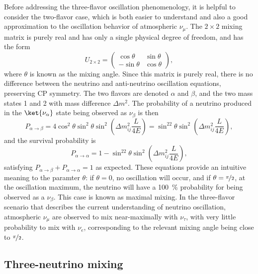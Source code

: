 Before addressing the three-flavor oscillation phenomenology,
it is helpful to consider the two-flavor case,
which is both easier to understand
and also a good approximation to the oscillation behavior
of atmospheric $\nu_\mu$.
The $2\times2$ mixing matrix is purely real
and has only a single physical degree of freedom,
and has the form
\begin{equation}\label{eq:2d_mixing}
    U_{2\times2} =
    \begin{pmatrix}
        \cos\theta & \sin\theta \\
        -\sin\theta & \cos\theta
    \end{pmatrix},
\end{equation}
where $\theta$ is known as the mixing angle.
Since this matrix is purely real,
there is no difference between the neutrino and anti-neutrino
oscillation equations, preserving CP symmetry.
The two flavors are denoted $\alpha$ and $\beta$,
and the two mass states 1 and 2 with mass difference $\Delta m^2$.
The probability of a neutrino produced in the $\ket{\nu_\alpha}$ state
being observed as $\nu_\beta$ is then
\begin{equation}\label{eq:2d_osc}
    P_{\alpha\to\beta} = 4\cos^2\theta\sin^2\theta
    \sin^2\left(\Delta m^2_{ij}\frac{L}{4E}\right)
    = \sin^22\theta \sin^2\left(\Delta m^2_{ij}\frac{L}{4E}\right),
\end{equation}
and the survival probability is
\begin{equation}\label{eq:2d_p_sur}
    P_{\alpha\to\alpha} = 1 -
    \sin^22\theta \sin^2\left(\Delta m^2_{ij}\frac{L}{4E}\right),
\end{equation}
satisfying $P_{\alpha\to\beta} + P_{\alpha\to\alpha} = 1$ as expected.
These equations provide an intuitive meaning to the paramter $\theta$:
if $\theta = 0$, no oscillation will occur,
and if $\theta = \nicefrac{\pi}{2}$,
at the oscillation maximum, the neutrino will have a \SI{100}{\percent}
probability for being observed as a $\nu_\beta$.
This case is known as maximal mixing.
In the three-flavor scenario that describes the current understanding
of neutrino oscillation,
atmospheric $\nu_\mu$ are observed to mix near-maximally with $\nu_\tau$,
with very little probability to mix with $\nu_e$,
corresponding to the relevant mixing angle being close to $\nicefrac{\pi}{2}$.

\subsection{Three-neutrino mixing}

